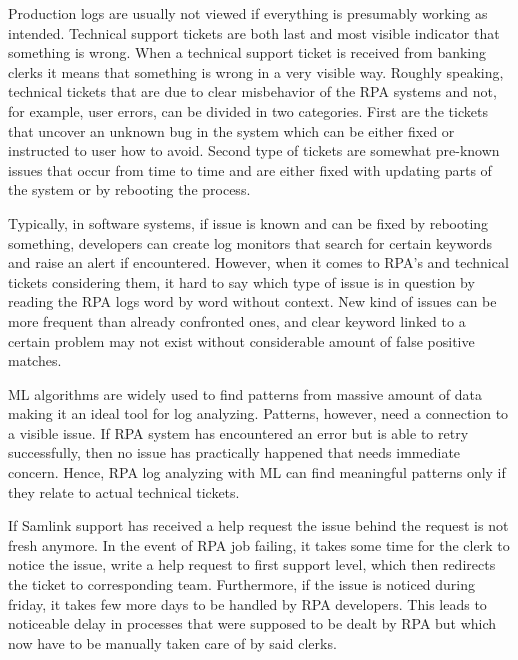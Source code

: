 Production logs are usually not viewed
if everything is presumably working as intended.
Technical support tickets are both
last and most visible indicator
that something is wrong.
When a technical support ticket is received from banking clerks
it means that something is wrong
in a very visible way.
Roughly speaking,
technical tickets that are due to
clear misbehavior of the RPA systems
and not, for example, user errors,
can be divided in two categories.
First are the tickets
that uncover an unknown bug in the system
which can be either fixed
or instructed to user how to avoid.
Second type of tickets are
somewhat pre-known issues
that occur from time to time
and are either fixed with updating parts of the system
or by rebooting the process.

Typically,
in software systems,
if issue is known and can be fixed by rebooting something,
developers can create log monitors
that search for certain keywords
and raise an alert if encountered.
However,
when it comes to RPA's and technical tickets considering them,
it hard to say which type of issue is in question
by reading the RPA logs word by word without context.
New kind of issues can be more frequent
than already confronted ones,
and clear keyword linked to
a certain problem may not exist
without considerable amount of false positive matches.

ML algorithms are widely used
to find patterns from massive amount of data
making it an ideal tool for log analyzing.
Patterns, however,
need a connection to a visible issue.
If RPA system has encountered an error
but is able to retry successfully,
then no issue has practically happened
that needs immediate concern.
Hence,
RPA log analyzing with ML can find meaningful patterns
only if they relate to actual technical tickets.

If Samlink support has received a help request
the issue behind the request is not fresh anymore.
In the event of RPA job failing,
it takes some time for the clerk to notice the issue,
write a help request to first support level,
which then redirects the ticket to corresponding team.
Furthermore,
if the issue is noticed during friday,
it takes few more days to be handled by RPA developers.
This leads to noticeable delay in processes
that were supposed to be dealt by RPA
but which now have to be manually taken care of
by said clerks.



